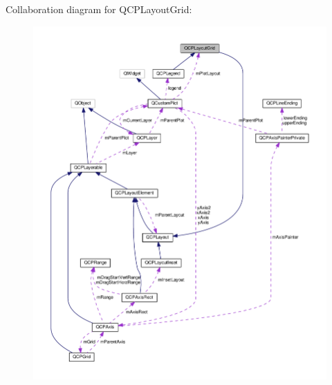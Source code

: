 Collaboration diagram for Q\+C\+P\+Layout\+Grid\+:
\nopagebreak
\begin{figure}[H]
\begin{center}
\leavevmode
\includegraphics[width=350pt]{classQCPLayoutGrid__coll__graph}
\end{center}
\end{figure}

